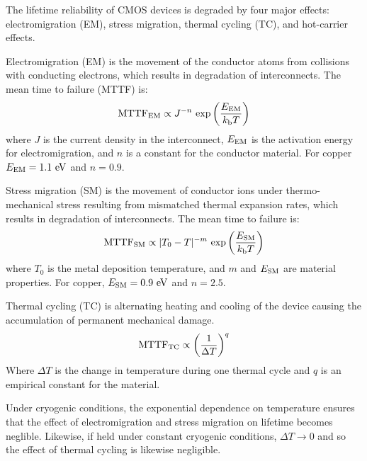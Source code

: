 \documentclass[12pt]{article}
\begin{document}
The lifetime reliability of CMOS devices is degraded by four major effects:  electromigration (EM), stress migration, thermal cycling (TC), and hot-carrier effects.

Electromigration (EM) is the movement of the conductor atoms from collisions with conducting electrons, which results in degradation of interconnects.  The mean time to failure (MTTF) is:
\begin{displaymath}
{\rm MTTF}_{\rm EM} \propto J^{-n} \, \exp\left( \frac{E_{\rm EM}}{k_{\rm b}T}\right)
\end{displaymath}
where $J$ is the current density in the interconnect, $E_{\rm EM}$ is the activation energy for electromigration, and $n$ is a constant for the conductor material.  For copper $E_{\rm EM} = 1.1~\rm eV$ and $n=0.9$.  

Stress migration (SM) is the movement of conductor ions under thermo-mechanical stress resulting from mismatched thermal expansion rates, which results in degradation of interconnects.  The mean time to failure is:
\begin{displaymath}
{\rm MTTF}_{\rm SM} \propto  |T_0 - T|^{-m} \, \exp\left( \frac{E_{\rm SM}}{k_{\rm b}T}\right)
\end{displaymath}
where $T_0$ is the metal deposition temperature, and $m$ and $E_{\rm SM}$ are material properties.  For copper, $E_{\rm SM} = 0.9~\rm eV$ and $n=2.5$.

Thermal cycling (TC) is alternating heating and cooling of the device causing the accumulation of permanent mechanical damage.
\begin{displaymath}
{\rm MTTF}_{\rm TC} \propto \left( \frac{1}{\Delta T}\right)^q
\end{displaymath}
Where $\Delta T$ is the change in temperature during one thermal cycle and $q$ is an empirical constant for the material.  

Under cryogenic conditions, the exponential dependence on temperature ensures that the effect of electromigration and stress migration on lifetime becomes neglible.  Likewise, if held under constant cryogenic conditions, $\Delta T \to 0$ and so the effect of thermal cycling is likewise negligible.
\end{document}
